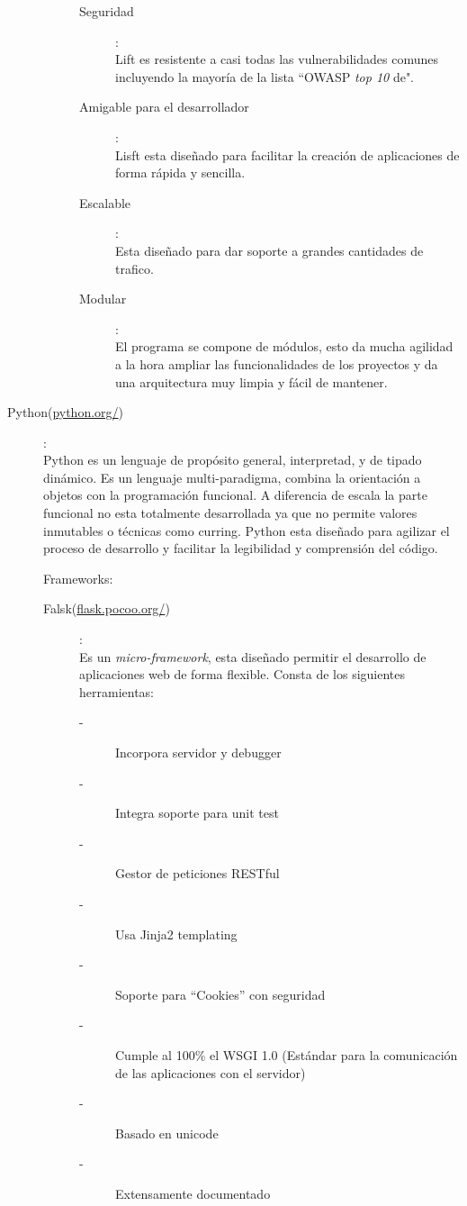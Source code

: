 \begin{description}
\begin{description}
\begin{description}
\item[Seguridad]: \\Lift es resistente a casi todas las vulnerabilidades comunes incluyendo la mayoría de la lista ``OWASP \textit{top 10} de".
\item[Amigable para el desarrollador]: \\Lisft esta diseñado para facilitar la creación de aplicaciones de forma rápida y sencilla.
\item[Escalable]: \\Esta diseñado para dar soporte a grandes cantidades de trafico.
\item[Modular]: \\El programa se compone de módulos, esto da mucha agilidad a la hora ampliar las funcionalidades de los proyectos y da una arquitectura muy limpia y fácil de mantener.
\end{description}
\end{description}


\item[Python(\url{python.org/})]:
\\Python es un lenguaje de propósito general, interpretad, y de tipado dinámico. Es un lenguaje multi-paradigma, combina la orientación a objetos con la programación funcional. A diferencia de escala la parte funcional no esta totalmente desarrollada ya que no permite valores inmutables o técnicas como curring. Python esta diseñado para agilizar el proceso de desarrollo y facilitar la legibilidad y comprensión del código.

Frameworks:
\begin{description}
\item[Falsk(\url{flask.pocoo.org/})]:
\\Es un \textit{micro-framework}, esta diseñado permitir el desarrollo de aplicaciones web de forma flexible. Consta de los siguientes herramientas:
\begin{description}
\item[-]Incorpora servidor y debugger
\item[-]Integra soporte para unit test
\item[-]Gestor de peticiones RESTful
\item[-]Usa Jinja2 templating
\item[-]Soporte para ``Cookies'' con seguridad
\item[-]Cumple al 100\% el WSGI 1.0 (Estándar para la comunicación de las aplicaciones con el servidor) 
\item[-]Basado en unicode
\item[-]Extensamente documentado
\end{description}


\end{description}
\end{description}
